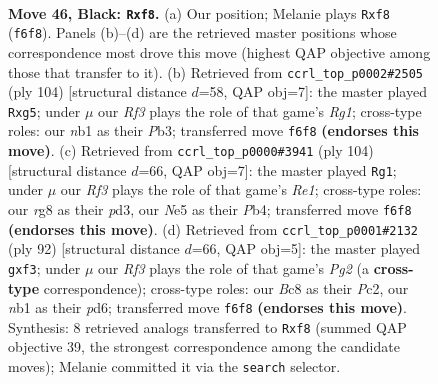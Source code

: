 \documentclass[11pt]{article}
\begin{document}
\clearpage

\begin{figure}[p]\centering
\begin{subfigure}{0.46\textwidth}\centering
\resizebox{\linewidth}{!}{%
\newchessgame
\chessboard[
  setfen={2b2BR1/p3k2p/1P3r2/4nP2/1p1p4/8/p3P3/1N1K4 b - - 1 46},
  showmover=false,
  pgfstyle=straightmove, color=movearrow, markmove={f6-f8}
]}
\caption{}
\end{subfigure}\hfill
\begin{subfigure}{0.46\textwidth}\centering
\resizebox{\linewidth}{!}{%
\newchessgame
\chessboard[
  setfen={3k4/7p/7P/1pP1N1p1/p2p1r2/1P3b2/P4K2/6R1 w - - 0 53},
  showmover=false,
  pgfstyle=straightmove, color=movearrow, markmove={g1-g5}
]}
\caption{}
\end{subfigure}
\\[4pt]
\begin{subfigure}{0.46\textwidth}\centering
\resizebox{\linewidth}{!}{%
\newchessgame
\chessboard[
  setfen={r7/8/3kp1pp/pB6/PP5P/2Pp4/2bK4/4R3 w - - 1 53},
  showmover=false,
  pgfstyle=straightmove, color=movearrow, markmove={e1-g1}
]}
\caption{}
\end{subfigure}\hfill
\begin{subfigure}{0.46\textwidth}\centering
\resizebox{\linewidth}{!}{%
\newchessgame
\chessboard[
  setfen={3k4/2p4R/3p4/3P1r2/7p/5b2/1PP2KP1/8 w - - 2 47},
  showmover=false,
  pgfstyle=straightmove, color=movearrow, markmove={g2-f3}
]}
\caption{}
\end{subfigure}
\caption{\textbf{Move 46, Black: \texttt{Rxf8}.} (a) Our position; Melanie plays \texttt{Rxf8} (\texttt{f6f8}). Panels (b)--(d) are the retrieved master positions whose correspondence most drove this move (highest QAP objective among those that transfer to it). (b) Retrieved from \texttt{ccrl\_top\_p0002\#2505} (ply 104) [structural distance $d$=58, QAP obj=7]: the master played \texttt{Rxg5}; under $\mu$ our \emph{Rf3} plays the role of that game's \emph{Rg1}; cross-type roles: our \emph{n}b1 as their \emph{P}b3; transferred move \texttt{f6f8} \textbf{(endorses this move)}. (c) Retrieved from \texttt{ccrl\_top\_p0000\#3941} (ply 104) [structural distance $d$=66, QAP obj=7]: the master played \texttt{Rg1}; under $\mu$ our \emph{Rf3} plays the role of that game's \emph{Re1}; cross-type roles: our \emph{r}g8 as their \emph{p}d3, our \emph{N}e5 as their \emph{P}b4; transferred move \texttt{f6f8} \textbf{(endorses this move)}. (d) Retrieved from \texttt{ccrl\_top\_p0001\#2132} (ply 92) [structural distance $d$=66, QAP obj=5]: the master played \texttt{gxf3}; under $\mu$ our \emph{Rf3} plays the role of that game's \emph{Pg2} (a \textbf{cross-type} correspondence); cross-type roles: our \emph{B}c8 as their \emph{P}c2, our \emph{n}b1 as their \emph{p}d6; transferred move \texttt{f6f8} \textbf{(endorses this move)}. Synthesis: 8 retrieved analogs transferred to \texttt{Rxf8} (summed QAP objective 39, the strongest correspondence among the candidate moves); Melanie committed it via the \texttt{search} selector.}
\label{fig:thought-m91}
\end{figure}
\end{document}
